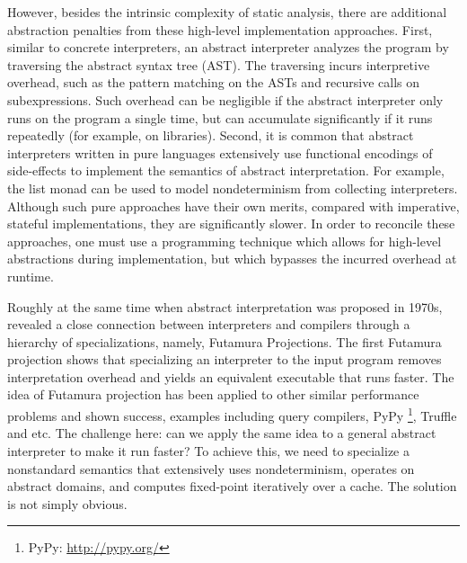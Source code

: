However, besides the intrinsic complexity of static analysis, there are
additional abstraction penalties from these high-level implementation
approaches. First, similar to concrete interpreters, an abstract interpreter
analyzes the program by traversing the abstract syntax tree (AST). The traversing incurs
interpretive overhead, such as the pattern matching on the ASTs and recursive
calls on subexpressions. Such overhead can be negligible if the abstract
interpreter only runs on the program a single time, but can accumulate
significantly if it runs repeatedly (for example, on libraries).  Second, it is
common that abstract interpreters written in pure languages extensively use
functional encodings of side-effects to implement the semantics of abstract interpretation. 
For example, the list monad can be used to model nondeterminism from collecting
interpreters.
Although such pure approaches have their own merits, compared with imperative,
stateful implementations, they are significantly slower.  In order to
reconcile these approaches, one must use a programming technique which allows
for high-level abstractions during implementation, but which bypasses the
incurred overhead at runtime.

Roughly at the same time when abstract interpretation was proposed in
1970s, \citet{futamura1971partial} revealed a close
connection between interpreters and compilers through a hierarchy of
specializations, namely, Futamura Projections. The first Futamura
projection shows that specializing an interpreter to the input program
removes interpretation overhead and yields an equivalent executable
that runs faster. The idea of Futamura projection has been applied to 
other similar performance problems and shown success, examples including
query compilers\cite{DBLP:conf/sigmod/TahboubER18}, PyPy \footnote{PyPy:
\url{http://pypy.org/}}, Truffle \cite{Marr:2015:TVP:2814270.2814275} and etc.
The challenge here: can we apply the same idea to a general abstract interpreter
to make it run faster? To achieve this, we need to specialize a nonstandard
semantics that extensively uses nondeterminism, operates on abstract domains,
and computes fixed-point iteratively over a cache. The solution is not simply obvious.

